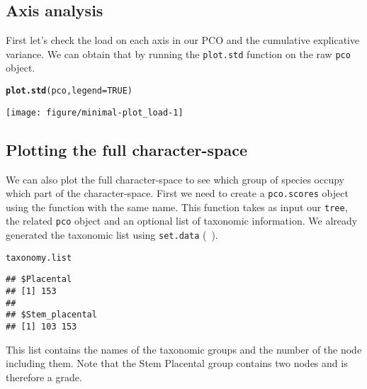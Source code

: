 \documentclass[a4paper,11pt]{article}\usepackage[]{graphicx}\usepackage[]{color}
\makeatletter
\def\maxwidth{ %
  \ifdim\Gin@nat@width>\linewidth
    \linewidth
  \else
    \Gin@nat@width
  \fi
}
\newcommand{\hlnum}[1]{\textcolor[rgb]{0.686,0.059,0.569}{#1}}%
\newcommand{\hlstd}[1]{\textcolor[rgb]{0.345,0.345,0.345}{#1}}%
\newcommand{\hlkwc}[1]{\textcolor[rgb]{0.333,0.667,0.333}{#1}}%
\newcommand{\hlkwd}[1]{\textcolor[rgb]{0.737,0.353,0.396}{\textbf{#1}}}%
\newenvironment{kframe}{%
 \def\at@end@of@kframe{}%
 \ifinner\ifhmode%
  \def\at@end@of@kframe{\end{minipage}}%
  \begin{minipage}{\columnwidth}%
 \fi\fi%
 \def\FrameCommand##1{\hskip\@totalleftmargin \hskip-\fboxsep
 \colorbox{shadecolor}{##1}\hskip-\fboxsep
     \hskip-\linewidth \hskip-\@totalleftmargin \hskip\columnwidth}%
 \MakeFramed {\advance\hsize-\width
   \@totalleftmargin\z@ \linewidth\hsize
   \@setminipage}}%
 {\par\unskip\endMakeFramed%
 \at@end@of@kframe}
\newenvironment{knitrout}{}{} %
\makeatother
\begin{document}
\subsection{Axis analysis}
First let's check the load on each axis in our PCO and the cumulative explicative variance.
We can obtain that by running the \texttt{plot.std} function on the raw \texttt{pco} object.

\begin{knitrout}
\color{fgcolor}\begin{kframe}
\begin{alltt}
\hlkwd{plot.std}\hlstd{(pco,} \hlkwc{legend}\hlstd{=}\hlnum{TRUE}\hlstd{)}
\end{alltt}
\end{kframe}

{\centering \texttt{[image: figure/minimal-plot\_load-1]} 

}



\end{knitrout}

\subsection{Plotting the full character-space}
We can also plot the full character-space to see which group of species occupy which part of the character-space.
First we need to create a \texttt{pco.scores} object using the function with the same name.
This function takes as input our \texttt{tree}, the related \texttt{pco} object and an optional list of taxonomic information.
We already generated the taxonomic list using \texttt{set.data} (~\label{data}).

\begin{knitrout}
\color{fgcolor}\begin{kframe}
\begin{alltt}
\hlstd{taxonomy.list}
\end{alltt}
\begin{verbatim}
## $Placental
## [1] 153
## 
## $Stem_placental
## [1] 103 153
\end{verbatim}
\end{kframe}
\end{knitrout}

This list contains the names of the taxonomic groups and the number of the node including them.
Note that the Stem Placental group contains two nodes and is therefore a grade.
\end{document}
